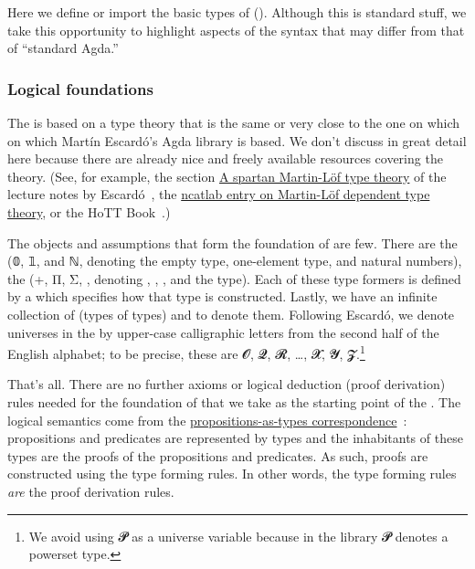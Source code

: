 Here we define or import the basic types of  (\mltt).  Although this is standard stuff, we take this opportunity to highlight aspects of the \ualib syntax that may differ from that of ``standard Agda.''

\subsubsection{Logical foundations}\label{sec:logical-foundations}
The \agdaualib is based on a type theory that is the same or very close to the one on which on which Martín Escardó's \typetopology Agda library is based. We don't discuss \mltt in great detail here because there are already nice and freely available resources covering the theory. (See, for example, the section \href{https://www.cs.bham.ac.uk/~mhe/HoTT-UF-in-Agda-Lecture-Notes/HoTT-UF-Agda.html\#mlttinagda}{A spartan Martin-Löf type theory} of the lecture notes by Escard\'o~\cite{MHE}, the \href{https://ncatlab.org/nlab/show/Martin-L\%C3\%B6f+dependent+type+theory}{ncatlab entry on Martin-Löf dependent type theory}, or the HoTT Book~\cite{HoTT}.)

The objects and assumptions that form the foundation of \mltt are few.  There are the  (\ad 𝟘, \ad 𝟙, and \ad ℕ, denoting the empty type, one-element type, and natural numbers), the  (\ad +, \ad Π, \ad Σ, , denoting , , , and the  type). Each of these type formers is defined by a  which specifies how that type is constructed. Lastly, we have an infinite collection of  (types of types) and  to denote them. Following Escardó, we denote universes in the \ualib by upper-case calligraphic letters from the second half of the English alphabet; to be precise, these are \ab 𝓞, \ab 𝓠, \ab 𝓡, …, \ab 𝓧, \ab 𝓨, \ab 𝓩.\footnote{We avoid using \ab 𝓟 as a universe variable because in the \typetopology library \ab 𝓟 denotes a powerset type.}

That's all. There are no further axioms or logical deduction (proof derivation) rules needed for the foundation of \mltt that we take as the starting point of the \agdaualib. The logical semantics come from the \href{https://ncatlab.org/nlab/show/propositions+as+types}{propositions-as-types correspondence}~\cite{nlab:propositions_as_types}: propositions and predicates are represented by types and the inhabitants of these types are the proofs of the propositions and predicates. As such, proofs are constructed using the type forming rules. In other words, the type forming rules \emph{are} the proof derivation rules.

